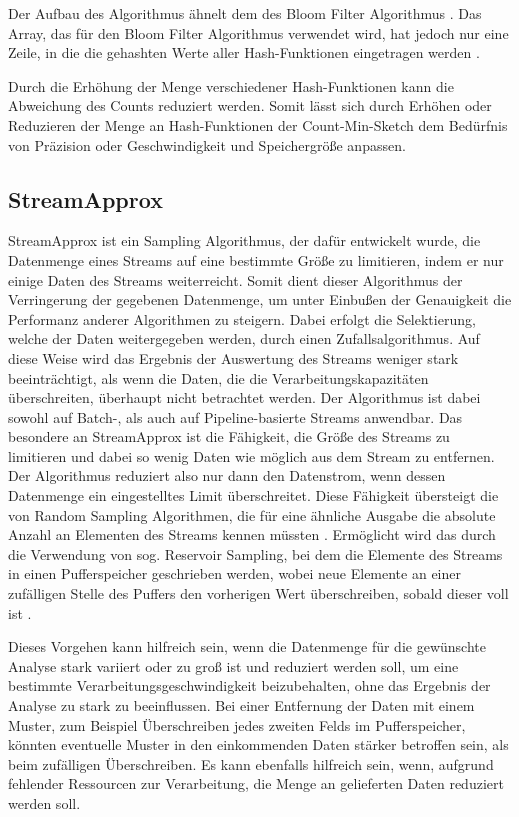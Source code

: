 Der Aufbau des Algorithmus ähnelt dem des Bloom Filter Algorithmus \cite{cormode2017}. 
Das Array, das für den Bloom Filter Algorithmus verwendet wird, 
hat jedoch nur eine Zeile, in die die gehashten Werte aller Hash-Funktionen eingetragen werden \cite{cormode2017}.

Durch die Erhöhung der Menge verschiedener Hash-Funktionen kann die Abweichung des Counts reduziert werden. 
Somit lässt sich durch Erhöhen oder Reduzieren der Menge an Hash-Funktionen 
der Count-Min-Sketch dem Bedürfnis von Präzision oder Geschwindigkeit und Speichergröße anpassen.

\subsection{StreamApprox}

StreamApprox ist ein Sampling Algorithmus, der dafür entwickelt wurde, 
die Datenmenge eines Streams auf eine bestimmte Größe zu limitieren, 
indem er nur einige Daten des Streams weiterreicht. 
Somit dient dieser Algorithmus der Verringerung der gegebenen Datenmenge,
um unter Einbußen der Genauigkeit die Performanz anderer Algorithmen zu steigern.
Dabei erfolgt die Selektierung, welche der Daten weitergegeben werden, durch einen Zufallsalgorithmus. 
Auf diese Weise wird das Ergebnis der Auswertung des Streams weniger stark beeinträchtigt, 
als wenn die Daten, die die Verarbeitungskapazitäten überschreiten, 
überhaupt nicht betrachtet werden. 
Der Algorithmus ist dabei sowohl auf Batch-, als auch auf Pipeline-basierte Streams anwendbar.
Das besondere an StreamApprox ist die Fähigkeit, 
die Größe des Streams zu limitieren und dabei so wenig Daten wie möglich aus dem Stream zu entfernen. 
Der Algorithmus reduziert also nur dann den Datenstrom, wenn dessen Datenmenge ein eingestelltes Limit überschreitet. 
Diese Fähigkeit übersteigt die von Random Sampling Algorithmen, 
die für eine ähnliche Ausgabe die absolute Anzahl an Elementen des Streams kennen müssten \cite{quoc2017}. 
Ermöglicht wird das durch die Verwendung von sog. Reservoir Sampling, 
bei dem die Elemente des Streams in einen Pufferspeicher geschrieben werden, 
wobei neue Elemente an einer zufälligen Stelle des Puffers den vorherigen Wert überschreiben, sobald dieser voll ist \cite{quoc2017}. 

Dieses Vorgehen kann hilfreich sein, 
wenn die Datenmenge für die gewünschte Analyse stark variiert oder zu groß ist und reduziert werden soll, 
um eine bestimmte Verarbeitungsgeschwindigkeit beizubehalten, 
ohne das Ergebnis der Analyse zu stark zu beeinflussen.
Bei einer Entfernung der Daten mit einem Muster, zum Beispiel Überschreiben jedes zweiten Felds im Pufferspeicher, 
könnten eventuelle Muster in den einkommenden Daten stärker betroffen sein, als beim zufälligen Überschreiben.
Es kann ebenfalls hilfreich sein, 
wenn, aufgrund fehlender Ressourcen zur Verarbeitung, 
die Menge an gelieferten Daten reduziert werden soll.